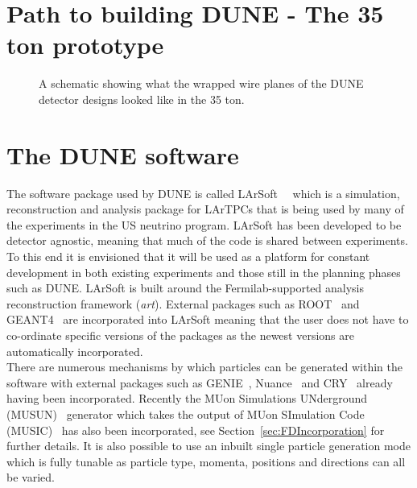 \section{Path to building DUNE - The 35 ton prototype} \label{sec:The35tonDetector}  %

\begin{figure}[h]
  \centering
  \caption[The wrapped wires of the 35 ton]{A schematic showing what the wrapped wire planes of the DUNE detector designs looked like in the 35 ton.}
  \label{fig:35tonWireGeom}
\end{figure}

\section{The DUNE software} \label{sec:LArSoft} %
The software package used by DUNE is called LArSoft~\citep{Church_LArSoft}~\citep{LArSoftOrg} which is a simulation, reconstruction and analysis package for LArTPCs that is being used by many of the experiments in the US neutrino program. LArSoft has been developed to be detector agnostic, meaning that much of the code is shared between experiments. To this end it is envisioned that it will be used as a platform for constant development in both existing experiments and those still in the planning phases such as DUNE. LArSoft is built around the Fermilab-supported analysis reconstruction framework (\emph{art}). External packages such as ROOT~\citep{ROOT} and GEANT4~\citep{GEANT4} are incorporated into LArSoft meaning that the user does not have to co-ordinate specific versions of the packages as the newest versions are automatically incorporated. \\

There are numerous mechanisms by which particles can be generated within the software with external packages such as GENIE~\citep{GENIE}, Nuance~\citep{Nuance} and CRY~\citep{CRY} already having been incorporated. Recently the MUon Simulations UNderground (MUSUN)~\citep{MUSUN} generator which takes the output of MUon SImulation Code (MUSIC)~\citep{MUSIC} has also been incorporated, see Section~\ref{sec:FDIncorporation} for further details. It is also possible to use an inbuilt single particle generation mode which is fully tunable as particle type, momenta, positions and directions can all be varied. \\

